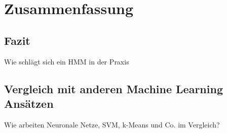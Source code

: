 \chapter{Zusammenfassung}  \label{mainsec:result}

\section{Fazit}
Wie schlägt sich ein HMM in der Praxis

\section{Vergleich mit anderen Machine Learning Ansätzen}
\label{sec:compare}
Wie arbeiten Neuronale Netze, SVM, k-Means und Co. im Vergleich?